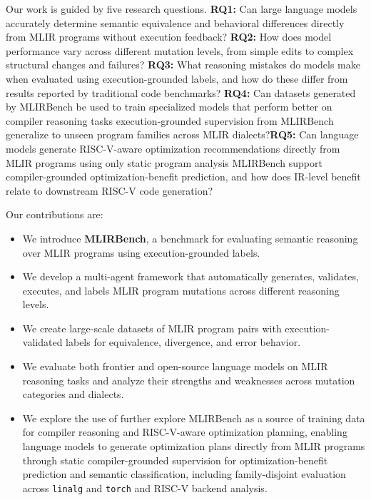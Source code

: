 \documentclass[sigplan,screen,review,anonymous]{acmart}
\providecommand{\DIFadd}[1]{{\protect\color{blue} \sf #1}} %
\providecommand{\DIFdel}[1]{{\protect\color{red} \scriptsize #1}} %
\providecommand{\DIFaddbegin}{} %
\providecommand{\DIFaddend}{} %
\providecommand{\DIFdelbegin}{} %
\providecommand{\DIFdelend}{} %
\begin{document}
Our work is guided by five research questions. \textbf{RQ1:} Can large language models accurately determine semantic equivalence and behavioral differences directly from MLIR programs without execution feedback? \textbf{RQ2:} How does model performance vary across different mutation levels, from simple edits to complex structural changes and failures? \textbf{RQ3:} What reasoning mistakes do models make when evaluated using execution-grounded labels, and how do these differ from results reported by traditional code benchmarks? \textbf{RQ4:} Can \DIFdelbegin \DIFdel{datasets generated by MLIRBench
be used to train specialized models that perform better on compiler reasoning tasks}\DIFdelend \DIFaddbegin \DIFadd{execution-grounded supervision from MLIRBench
generalize to unseen program families across MLIR dialects}\DIFaddend ?\textbf{RQ5:} Can \DIFdelbegin \DIFdel{language models generate RISC-V-aware optimization recommendations directly from MLIR programs using only static program analysis}\DIFdelend \DIFaddbegin \DIFadd{MLIRBench support compiler-grounded optimization-benefit prediction, and how does IR-level benefit relate to downstream RISC-V code generation}\DIFaddend ?

Our contributions are:

\begin{itemize}
    \item We introduce \textbf{MLIRBench}, a benchmark for evaluating semantic reasoning over MLIR programs using execution-grounded labels.

    \item We develop a multi-agent framework that automatically generates, validates, executes, and labels MLIR program mutations across different reasoning levels.

    \item We create large-scale datasets of MLIR program pairs with execution-validated labels for equivalence, divergence, and error behavior.

    \item We evaluate both frontier and open-source language models on MLIR reasoning tasks and analyze their strengths and weaknesses across mutation categories and dialects.

    \item We \DIFdelbegin \DIFdel{explore the use of }\DIFdelend \DIFaddbegin \DIFadd{further explore }\DIFaddend MLIRBench as a source of \DIFdelbegin \DIFdel{training data for compiler reasoning and RISC-V-aware optimization planning, enabling language models to generate optimization plans directly from MLIR programs through static }\DIFdelend \DIFaddbegin \DIFadd{compiler-grounded supervision
for optimization-benefit prediction and semantic classification, including
family-disjoint evaluation across \texttt{linalg} and \texttt{torch} and
RISC-V backend }\DIFaddend analysis.
\end{itemize}
\end{document}
